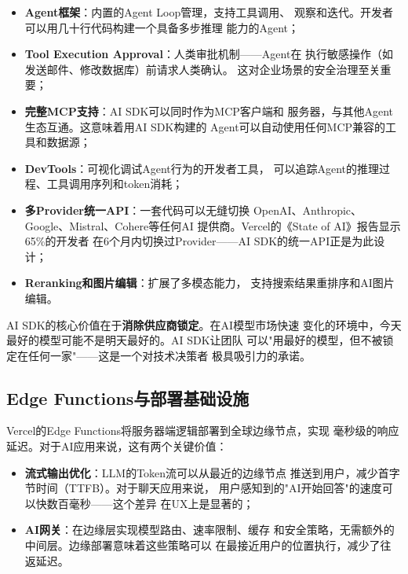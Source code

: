 \begin{itemize}
  \item \textbf{Agent框架}：内置的Agent Loop管理，支持工具调用、
    观察和迭代。开发者可以用几十行代码构建一个具备多步推理
    能力的Agent；
  \item \textbf{Tool Execution Approval}：人类审批机制——Agent在
    执行敏感操作（如发送邮件、修改数据库）前请求人类确认。
    这对企业场景的安全治理至关重要；
  \item \textbf{完整MCP支持}：AI SDK可以同时作为MCP客户端和
    服务器，与其他Agent生态互通。这意味着用AI SDK构建的
    Agent可以自动使用任何MCP兼容的工具和数据源；
  \item \textbf{DevTools}：可视化调试Agent行为的开发者工具，
    可以追踪Agent的推理过程、工具调用序列和token消耗；
  \item \textbf{多Provider统一API}：一套代码可以无缝切换
    OpenAI、Anthropic、Google、Mistral、Cohere等任何AI
    提供商。Vercel的《State of AI》报告显示65\%的开发者
    在6个月内切换过Provider——AI SDK的统一API正是为此设计；
  \item \textbf{Reranking和图片编辑}：扩展了多模态能力，
    支持搜索结果重排序和AI图片编辑。
\end{itemize}

AI SDK的核心价值在于\textbf{消除供应商锁定}。在AI模型市场快速
变化的环境中，今天最好的模型可能不是明天最好的。AI SDK让团队
可以"用最好的模型，但不被锁定在任何一家"——这是一个对技术决策者
极具吸引力的承诺。

\subsection{Edge Functions与部署基础设施}
\label{subsec:vercel-edge}

Vercel的Edge Functions将服务器端逻辑部署到全球边缘节点，实现
毫秒级的响应延迟。对于AI应用来说，这有两个关键价值：

\begin{itemize}
  \item \textbf{流式输出优化}：LLM的Token流可以从最近的边缘节点
    推送到用户，减少首字节时间（TTFB）。对于聊天应用来说，
    用户感知到的"AI开始回答"的速度可以快数百毫秒——这个差异
    在UX上是显著的；
  \item \textbf{AI网关}：在边缘层实现模型路由、速率限制、缓存
    和安全策略，无需额外的中间层。边缘部署意味着这些策略可以
    在最接近用户的位置执行，减少了往返延迟。
\end{itemize}

